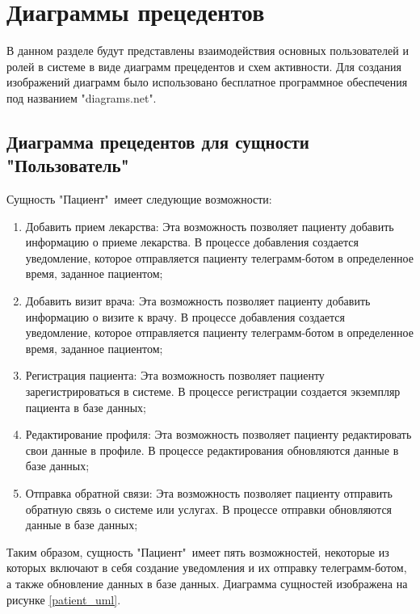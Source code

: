 \chapter{Диаграммы прецедентов}
    В данном разделе будут представлены взаимодействия основных пользователей %
    и ролей в системе в виде диаграмм прецедентов и схем активности. Для создания %
    изображений диаграмм было использовано бесплатное программное обеспечения под названием %
    "diagrams.net".\ \cite{diagrams_dot_net} %
    
    \section{Диаграмма прецедентов для сущности "Пользователь"\ }
        Сущность "Пациент"\ имеет следующие возможности:
        \begin{enumerate}
            \item Добавить прием лекарства: Эта возможность позволяет пациенту добавить %
            информацию о приеме лекарства. В процессе добавления создается уведомление, %
            которое отправляется пациенту телеграмм-ботом в определенное время, заданное пациентом;
            \item Добавить визит врача: Эта возможность позволяет пациенту добавить информацию о %
            визите к врачу. В процессе добавления создается уведомление, которое отправляется пациенту %
            телеграмм-ботом в определенное время, заданное пациентом;
            \item Регистрация пациента: Эта возможность позволяет пациенту зарегистрироваться в системе. %
            В процессе регистрации создается экземпляр пациента в базе данных;
            \item Редактирование профиля: Эта возможность позволяет пациенту редактировать свои данные в %
            профиле. В процессе редактирования обновляются данные в базе данных;
            \item Отправка обратной связи: Эта возможность позволяет пациенту отправить обратную связь о системе %
            или услугах. В процессе отправки обновляются данные в базе данных;
        \end{enumerate}
        
        Таким образом, сущность "Пациент"\ имеет пять возможностей, некоторые из которых %
        включают в себя создание уведомления и их отправку телеграмм-ботом, а также обновление %
        данных в базе данных. Диаграмма сущностей изображена на рисунке \ref{patient_uml}.

